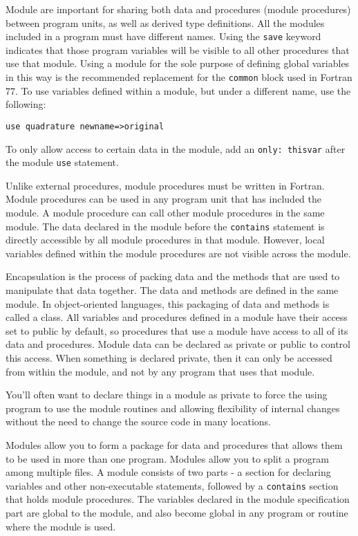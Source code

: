 \documentclass[10pt]{article}
\begin{document}
Module are important for sharing both data and procedures (module procedures) between program units, as well as derived type definitions. All the modules included in a program must have different names. Using the {\tt save} keyword indicates that those program variables will be visible to all other procedures that use that module. Using a module for the sole purpose of defining global variables in this way is the recommended replacement for the {\tt common} block used in Fortran 77. To use variables defined within a module, but under a different name, use the following:

\begin{lstlisting}
use quadrature newname=>original
\end{lstlisting}

To only allow access to certain data in the module, add an {\tt only: thisvar} after the module {\tt use} statement.

Unlike external procedures, module procedures must be written in Fortran. Module procedures can be used in any program unit that has included the module. A module procedure can call other module procedures in the same module. The data declared in the module before the {\tt contains} statement is directly accessible by all module procedures in that module. However, local variables defined within the module procedures are not visible across the module.

Encapsulation is the process of packing data and the methods that are used to manipulate that data together. The data and methods are defined in the same module. In object-oriented languages, this packaging of data and methods is called a class. All variables and procedures defined in a module have their access set to public by default, so procedures that use a module have access to all of its data and procedures. Module data can be declared as private or public to control this access. When something is declared private, then it can only be accessed from within the module, and not by any program that uses that module. 

You'll often want to declare things in a module as private to force the using program to use the module routines and allowing flexibility of internal changes without the need to change the source code in many locations.

Modules allow you to form a package for data and procedures that allows them to be used in more than one program. Modules allow you to split a program among multiple files. A module consists of two parts - a section for declaring variables and other non-executable statements, followed by a {\tt contains} section that holds module procedures. The variables declared in the module specification part are global to the module, and also become global in any program or routine where the module is used. 
\end{document}
